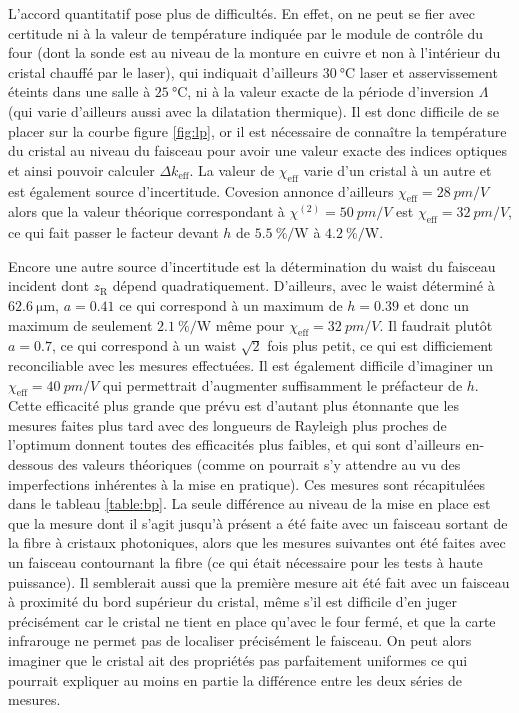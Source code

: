 \documentclass[11pt,a4paper] { article}
\newcommand{\zr}{z_\mathsc{R}}
\newcommand{\chie}{\chi_\mathsc{eff}}
\newcommand{\dke}{\Delta k_\mathsc{eff}}
\newcommand{\alphae}[1]{\SI{#1}{\percent\per\watt}}
\newcommand{\mathsc}[1]{\mathrm{\scriptscriptstyle {#1}}}
\begin{document}
L'accord quantitatif pose plus de difficultés. En effet, on ne peut se fier avec certitude ni à la valeur de température indiquée par le module de contrôle du four (dont la sonde est au niveau de la monture en cuivre et non à l'intérieur du cristal chauffé par le laser), qui indiquait d'ailleurs $\SI{30}{\celsius}$ laser et asservissement éteints dans une salle à $\SI{25}{\celsius}$, ni à la valeur exacte de la période d'inversion $\Lambda$ (qui varie d'ailleurs aussi avec la dilatation thermique). Il est donc difficile de se placer sur la courbe figure \ref{fig:lp}, or il est nécessaire de connaître la température du cristal au niveau du faisceau pour avoir une valeur exacte des indices optiques et ainsi pouvoir calculer $\dke$.
La valeur de $\chie$ varie d'un cristal à un autre et est également source d'incertitude. Covesion annonce d'ailleurs $\chie = \SI{28}{pm/V}$ alors que la valeur théorique correspondant à $\chi^{(2)}=\SI{50}{pm/V}$ est $\chie = \SI{32}{pm/V}$, ce qui fait passer le facteur devant $h$ de $\SI{5.5}{\percent\per\watt}$ à $\SI{4.2}{\percent\per\watt}$.

Encore une autre source d'incertitude est la détermination du waist du faisceau incident dont $\zr$ dépend quadratiquement. D'ailleurs, avec le waist déterminé à $\SI{62.6}{\micro\meter}$, $a=0.41$ ce qui correspond à un maximum de $h = 0.39$ et donc un maximum de seulement $\alphae{2.1}$ même pour $\chie = \SI{32}{pm/V}$. Il faudrait plutôt $a=0.7$, ce qui correspond à un waist $\sqrt2$ fois plus petit, ce qui est difficiement reconciliable avec les mesures effectuées. %
Il est également difficile d'imaginer un $\chie=\SI{40}{pm/V}$ qui permettrait d'augmenter suffisamment le préfacteur de $h$. Cette efficacité plus grande que prévu est d'autant plus étonnante que les mesures faites plus tard avec des longueurs de Rayleigh plus proches de l'optimum donnent toutes des efficacités plus faibles, et qui sont d'ailleurs en-dessous des valeurs théoriques (comme on pourrait s'y attendre au vu des imperfections inhérentes à la mise en pratique). Ces mesures sont récapitulées dans le tableau \ref{table:bp}. La seule différence au niveau de la mise en place est que la mesure dont il s'agit jusqu'à présent a été faite avec un faisceau sortant de la fibre à cristaux photoniques, alors que les mesures suivantes ont été faites avec un faisceau contournant la fibre (ce qui était nécessaire pour les tests à haute puissance). Il semblerait aussi que la première mesure ait été fait avec un faisceau à proximité du bord supérieur du cristal, même s'il est difficile d'en juger précisément car le cristal ne tient en place qu'avec le four fermé, et que la carte infrarouge ne permet pas de localiser précisément le faisceau. On peut alors imaginer que le cristal ait des propriétés pas parfaitement uniformes ce qui pourrait expliquer au moins en partie la différence entre les deux séries de mesures.
\end{document}
